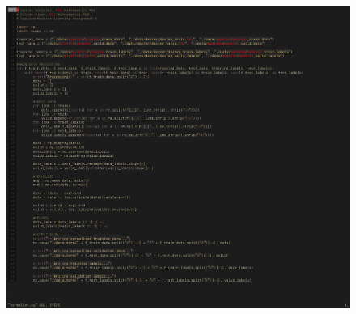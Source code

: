 \documentclass[UTF8]{article}
\begin{document}
\begin{figure}[H]
    \centering
    \includegraphics[scale=0.6]{./figures/code-normalize.png}
\end{figure}
\end{document}
